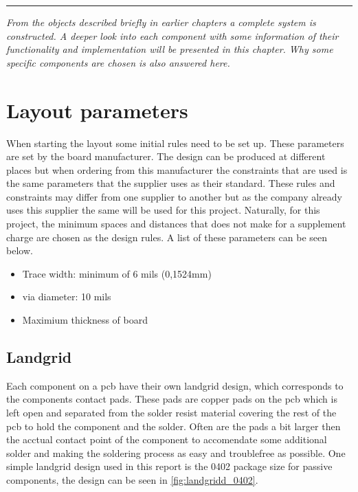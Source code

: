 
\vspace{-10ex}%
\rule{\textwidth}{0.3pt}
\vspace{5ex}

\textit{
From the objects described briefly in earlier chapters a complete system is constructed. A deeper look into each component with some information of their functionality and implementation will be presented in this chapter. Why some specific components are chosen is also answered here. 
}
\vspace{5ex}


\section{Layout parameters}

When starting the layout some initial rules need to be set up. These parameters are set by the board manufacturer.
The design can be produced at different places but when ordering from this manufacturer the constraints that are used is the same parameters that the supplier uses as their standard.
These rules and constraints may differ from one supplier to another but as the company already uses this supplier the same will be used for this project.
Naturally, for this project, the minimum spaces and distances that does not make for a supplement charge are chosen as the design rules. A list of these parameters can be seen below.

\begin{itemize}
\item Trace width: minimum of 6 mils (0,1524mm) 
\item \gls{via} diameter: 10 mils
\item Maximium thickness of board

\end{itemize}
 
\subsection{Landgrid}
Each component on a \gls{pcb} have their own landgrid design, which corresponds to the components contact pads. These pads are copper pads on the \gls{pcb} which is left open and separated from the solder resist material covering the rest of the \gls{pcb} to hold the component and the solder. Often are the pads a bit larger then the acctual contact point of the component to accomendate some additional solder and making the soldering process as easy and troublefree as possible. One simple landgrid design used in this report is the 0402 package size for passive components, the design can be seen in \autoref{fig:landgridd_0402}.

